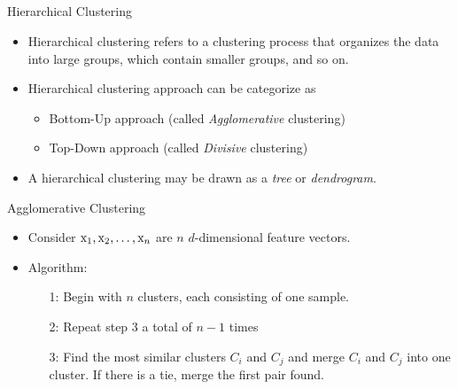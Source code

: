 \subsection{}
\begin{frame}{Hierarchical Clustering}
\begin{itemize}
\item Hierarchical clustering refers to a clustering process that organizes the data into large groups, which contain smaller groups, and so on.
\item Hierarchical clustering approach can be categorize as
\begin{itemize}
\item Bottom-Up approach (called \textit{\color{slidecolor}Agglomerative} clustering)
\item Top-Down approach (called \textit{\color{slidecolor}Divisive} clustering)
\end{itemize}
\item A hierarchical clustering may be drawn as a \textit{\color{slidecolor}tree} or \textit{\color{slidecolor}dendrogram}.
\end{itemize}
\end{frame}

\begin{frame}{Agglomerative Clustering}
\begin{itemize}
\setlength{\itemsep}{12pt}
\item Consider ${\rm x}_1,{\rm x}_2,\ldots,{\rm x}_n$ are $n$ $d$-dimensional feature vectors.
\item Algorithm:
\begin{itemize}
\item[1:] Begin with $n$ clusters, each consisting of one sample.
\item[2:] Repeat step 3 a total of $n-1$ times
\item[3:] Find the most similar clusters $C_i$ and $C_j$ and merge $C_i$ and $C_j$ into one cluster. If there is a tie, merge the first pair found.
\end{itemize}
\end{itemize}
\end{frame}

